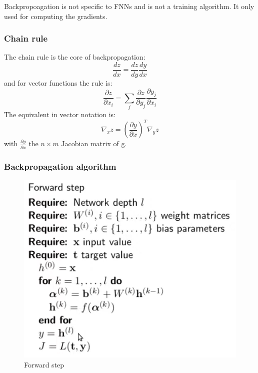 Backpropoagation is not specific to FNNs and is not a training algorithm. It only used for computing the gradients.

\subsubsection{Chain rule}
The chain rule is the core of backpropagation:
\begin{equation}
    \frac{dz}{dx} = \frac{dz}{dy}\frac{dy}{dx}
\end{equation}
and for vector functions the rule is:
\begin{equation}
    \frac{\partial z}{\partial x_{i}} = \sum_{j}\frac{\partial z}{\partial y_{j}}\frac{\partial y_{j}}{\partial x_{i}}
\end{equation}
The equivalent in vector notation is:
\begin{equation}
        \nabla_{x}z = \left(\frac{\partial y}{\partial x}\right)^{T} \nabla_{y}z
\end{equation}
with $\frac{\partial y}{\partial x}$ the $n \times m$ Jacobian matrix of g.

\subsubsection{Backpropagation algorithm}

\begin{figure}[H]
    \centering
    \includegraphics[width=15cm]{images/FNN/backprop_forward_Step.png}
    \caption{Forward step}
    \label{fig:forw_step}
\end{figure}

